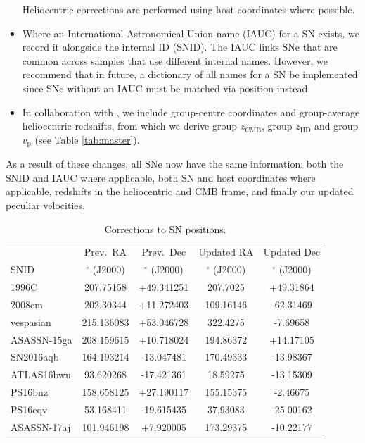 \documentclass[
  journal=pasa,
  manuscript=research-paper,
  year=2022,
]{cup-journal}
\newcommand{\zCMB}[1]{\ensuremath{z_{\text{CMB}}^{\mathrm{#1}}}}
\newcommand{\zHD}[1]{\ensuremath{z_{\text{HD}}^{\mathrm{#1}}}}
\newcommand\dg{\ensuremath{^{\circ}}}
\newcommand{\vp}{\ensuremath{v_{\text{p}}}}
\begin{document}
\begin{itemize}
     Heliocentric corrections are performed using host coordinates where possible.
    \item Where an International Astronomical Union name (IAUC) for a SN exists, we record it alongside the internal ID (SNID). The IAUC links SNe that are common across samples that use different internal names. However, we recommend that in future, a dictionary of all names for a SN be implemented since SNe without an IAUC must be matched via position instead. 
    \item In collaboration with \citet{Peterson2021}, we include group-centre coordinates and group-average heliocentric redshifts, from which we derive group \zCMB{}, group \zHD{} and group $\vp{}$ (see Table \ref{tab:master}).
\end{itemize}

As a result of these changes, all SNe now have the same information: both the SNID and IAUC where applicable, both SN and host coordinates where applicable, redshifts in the heliocentric and CMB frame, and finally our updated peculiar velocities.

\begin{table}[t!]
\caption{Corrections to SN positions.\label{tab:FSSpos}} 
\begin{tabular}{lS[table-format=3.6]S[table-format=3.6,retain-explicit-plus]S[table-format=3.5]S[table-format=3.5,retain-explicit-plus]}
\toprule
{} & {Prev.~RA} & {Prev.~Dec} & {Updated RA} & {Updated Dec} \\ {SNID} & {\dg{} (J2000)} & {\dg{} (J2000)} & {\dg{} (J2000)} & {\dg{} (J2000)}\\
 \midrule
1996C & 207.75158 & +49.341251 & 207.7025 & +49.31864 \\ 
2008cm & 202.30344 & +11.272403 & 109.16146 & -62.31469 \\
vespasian & 215.136083 & +53.046728 & 322.4275 & -7.69658\\
ASASSN-15ga & 208.159615 & +10.718024 & 194.86372 & +14.17105 \\
SN2016aqb & 164.193214 & -13.047481 & 170.49333 & -13.98367 \\
ATLAS16bwu & 93.620268 & -17.421361 & 18.59275 & -13.15309 \\
PS16bnz & 158.658125 & +27.190117 & 155.15375 & -2.46675 \\
PS16eqv & 53.168411 & -19.615435 & 37.93083 & -25.00162 \\
ASASSN-17aj & 101.946198 & +7.920005 & 173.29375 & -10.22177 \\
\bottomrule
\end{tabular}
\end{table}
\end{document}
